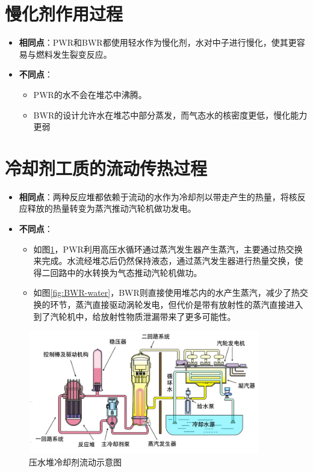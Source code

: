 \documentclass{article}
\begin{document}
\section{慢化剂作用过程}
\begin{itemize}
    \item \textbf{相同点}：PWR和BWR都使用轻水作为慢化剂，水对中子进行慢化，使其更容易与燃料发生裂变反应。
    \item \textbf{不同点}：
    \begin{itemize}
        \item PWR的水不会在堆芯中沸腾。
        \item BWR的设计允许水在堆芯中部分蒸发，而气态水的核密度更低，慢化能力更弱
    \end{itemize}
\end{itemize}

\section{冷却剂工质的流动传热过程}
\begin{itemize}
    \item \textbf{相同点}：两种反应堆都依赖于流动的水作为冷却剂以带走产生的热量，将核反应释放的热量转变为蒸汽推动汽轮机做功发电。
    \item \textbf{不同点}：
    \begin{itemize}
        \item 如图\ref{fig:PWR-water}，PWR利用高压水循环通过蒸汽发生器产生蒸汽，主要通过热交换来完成。水流经堆芯后仍然保持液态，通过蒸汽发生器进行热量交换，使得二回路中的水转换为气态推动汽轮机做功。
        \item 如图\ref{fig:BWR-water}，BWR则直接使用堆芯内的水产生蒸汽，减少了热交换的环节，蒸汽直接驱动涡轮发电，但代价是带有放射性的蒸汽直接进入到了汽轮机中，给放射性物质泄漏带来了更多可能性。
    \end{itemize}
\end{itemize}

\begin{figure}[htbp]
    \centering
    \includegraphics[width=0.9\textwidth]{figures/PWR-water.png}
    \caption{压水堆冷却剂流动示意图}
    \label{fig:PWR-water}
\end{figure}
\end{document}
